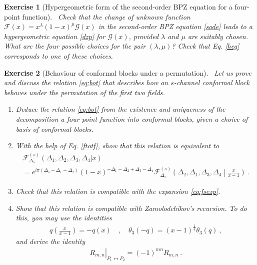 \documentclass[12pt, a4paper, notitlepage, twoside]{report}
\numberwithin{equation}{section}
\theoremstyle{break}
\newtheorem{exo}{Exercise}[chapter]
\begin{document}
\begin{exo}[Hypergeometric form of the second-order BPZ equation for a four-point function]
 ~\label{exohge}
 Check that the change of unknown function $\mathcal{F}(x)=x^{\lambda}(1-x)^{\mu}\mathcal{G}(x)$ in the second-order BPZ equation \eqref{sode} leads to a hypergeometric equation \eqref{dzp} for $\mathcal{G}(x)$, provided $\lambda$ and $\mu$ are suitably chosen.
What are the four possible choices for the pair $(\lambda,\mu)$?
Check that Eq. \eqref{heg} corresponds to one of these choices.
\end{exo}


\begin{exo}[Behaviour of conformal blocks under a permutation]
 ~\label{exobot}
Let us prove and discuss the relation \eqref{eq:bot} that describes how an $s$-channel conformal block behaves under the permutation of the first two fields.
\begin{enumerate}
 \item Deduce the relation \eqref{eq:bot} from the existence and uniqueness of the decomposition a four-point function into conformal blocks, given a choice of basis of conformal blocks.
 \item 
 With the help of Eq. \eqref{ftotf}, show that this relation is equivalent to 
 \begin{multline}
  \mathcal{F}^{(s)}_{\Delta_s}(\Delta_1,\Delta_2,\Delta_3,\Delta_4|x) 
  \\
  = e^{i\pi(\Delta_s-\Delta_1-\Delta_2)} (1-x)^{-\Delta_1-\Delta_2+\Delta_3-\Delta_4} \mathcal{F}^{(s)}_{\Delta_s}\left(\Delta_2,\Delta_1,\Delta_3,\Delta_4\middle|\tfrac{x}{x-1}\right)\ .
 \end{multline}
 \item Check that this relation is compatible with the expansion \eqref{eq:fsexp}.
 \item Show that this relation is compatible with Zamolodchikov's recursion. To do this, you may use the identities 
 \begin{align}
  q\left(\tfrac{x}{x-1}\right)=-q(x) \quad , \quad \theta_3(-q) = (x-1)^{\frac14}\theta_3(q)\ ,
 \end{align}
 and derive the identity
 \begin{align}
  \left. R_{m,n}\right|_{P_1\leftrightarrow P_2} = (-1)^{mn} R_{m,n}\ .
 \end{align}
\end{enumerate}

\end{exo}
\end{document}
